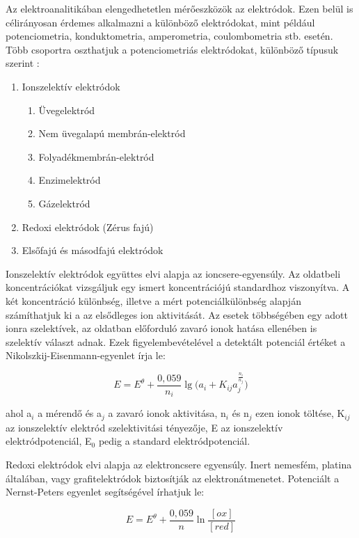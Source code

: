 Az elektroanalitikában elengedhetetlen mérőeszközök az elektródok. Ezen belül is célirányosan érdemes alkalmazni a különböző elektródokat, mint például potenciometria, konduktometria, amperometria, coulombometria stb. esetén.
Több csoportra oszthatjuk a potenciometriás elektródokat, különböző típusuk szerint \cite{kalman2002az}:
\begin{enumerate}  
    \item Ionszelektív elektródok
      \begin{enumerate}
	\item Üvegelektród
	\item Nem üvegalapú membrán-elektród
	\item Folyadékmembrán-elektród
	\item Enzimelektród
	\item Gázelektród
	\end{enumerate}
    \item Redoxi elektródok (Zérus fajú)
    \item Elsőfajú és másodfajú elektródok
\end{enumerate}
Ionszelektív elektródok együttes elvi alapja az ioncsere-egyensúly. Az oldatbeli koncentrációkat vizsgáljuk egy ismert koncentrációjú standardhoz viszonyítva. A két koncentráció különbség, illetve a mért potenciálkülönbség alapján számíthatjuk ki a az elsődleges ion aktivitását. Az esetek többségében egy adott ionra szelektívek, az oldatban előforduló zavaró ionok hatása ellenében is szelektív választ adnak. Ezek figyelembevételével a detektált potenciál értéket a Nikolszkij-Eisenmann-egyenlet írja le:

\begin{equation}
E = E^\theta + \frac{0,059}{n_i}\lg \Big (a_i + K_{ij} a_j^\frac{n_i}{n_j} \Big )
\label{eq:nikolszkij}
\end{equation}

ahol a$_i$  a mérendő és a$_j$ a zavaró ionok aktivitása, n$_i$ és n$_j$ ezen ionok töltése, K$_{ij}$ az ionszelektív elektród szelektivitási tényezője, E az ionszelektív elektródpotenciál, E$_0$ pedig a standard elektródpotenciál.

Redoxi elektródok elvi alapja az elektroncsere egyensúly. Inert nemesfém, platina általában, vagy grafitelektródok biztosítják az elektronátmenetet. Potenciált a Nernst-Peters egyenlet segítségével írhatjuk le:

\begin{equation}
E = E^\theta + \frac{0,059}{n}\ln \frac{[ox]}{[red]}
\label{eq:nernst}
\end{equation}

